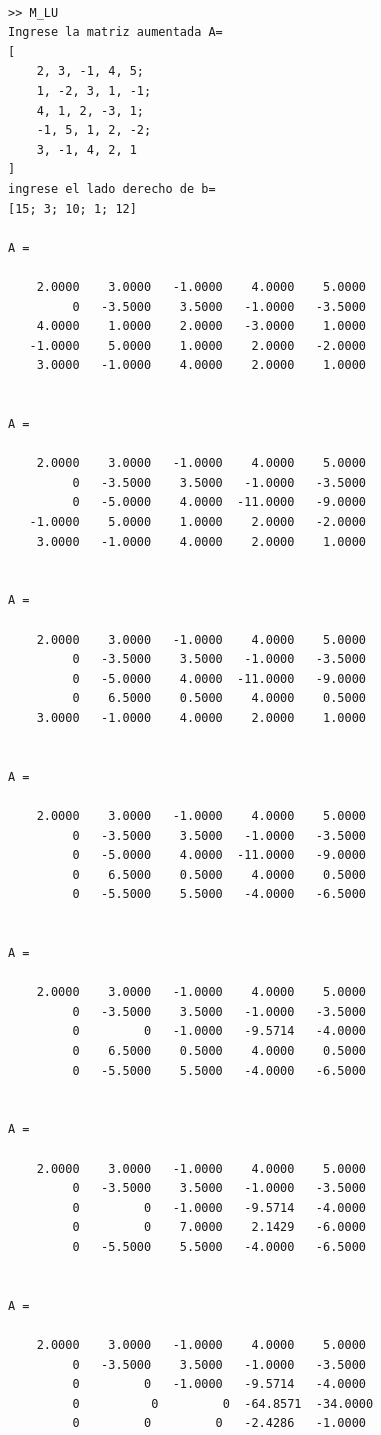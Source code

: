 \documentclass[12pt,a4paper,twoside]{article}  %
\begin{document}
\begin{verbatim}

>> M_LU
Ingrese la matriz aumentada A= 
[
    2, 3, -1, 4, 5;
    1, -2, 3, 1, -1;
    4, 1, 2, -3, 1;
    -1, 5, 1, 2, -2;
    3, -1, 4, 2, 1
]
ingrese el lado derecho de b=
[15; 3; 10; 1; 12]

A =

    2.0000    3.0000   -1.0000    4.0000    5.0000
         0   -3.5000    3.5000   -1.0000   -3.5000
    4.0000    1.0000    2.0000   -3.0000    1.0000
   -1.0000    5.0000    1.0000    2.0000   -2.0000
    3.0000   -1.0000    4.0000    2.0000    1.0000


A =

    2.0000    3.0000   -1.0000    4.0000    5.0000
         0   -3.5000    3.5000   -1.0000   -3.5000
         0   -5.0000    4.0000  -11.0000   -9.0000
   -1.0000    5.0000    1.0000    2.0000   -2.0000
    3.0000   -1.0000    4.0000    2.0000    1.0000


A =

    2.0000    3.0000   -1.0000    4.0000    5.0000
         0   -3.5000    3.5000   -1.0000   -3.5000
         0   -5.0000    4.0000  -11.0000   -9.0000
         0    6.5000    0.5000    4.0000    0.5000
    3.0000   -1.0000    4.0000    2.0000    1.0000


A =

    2.0000    3.0000   -1.0000    4.0000    5.0000
         0   -3.5000    3.5000   -1.0000   -3.5000
         0   -5.0000    4.0000  -11.0000   -9.0000
         0    6.5000    0.5000    4.0000    0.5000
         0   -5.5000    5.5000   -4.0000   -6.5000


A =

    2.0000    3.0000   -1.0000    4.0000    5.0000
         0   -3.5000    3.5000   -1.0000   -3.5000
         0         0   -1.0000   -9.5714   -4.0000
         0    6.5000    0.5000    4.0000    0.5000
         0   -5.5000    5.5000   -4.0000   -6.5000


A =

    2.0000    3.0000   -1.0000    4.0000    5.0000
         0   -3.5000    3.5000   -1.0000   -3.5000
         0         0   -1.0000   -9.5714   -4.0000
         0         0    7.0000    2.1429   -6.0000
         0   -5.5000    5.5000   -4.0000   -6.5000


A =

    2.0000    3.0000   -1.0000    4.0000    5.0000
         0   -3.5000    3.5000   -1.0000   -3.5000
         0         0   -1.0000   -9.5714   -4.0000
         0          0         0  -64.8571  -34.0000
         0         0         0   -2.4286   -1.0000



\end{verbatim}
\end{document}
